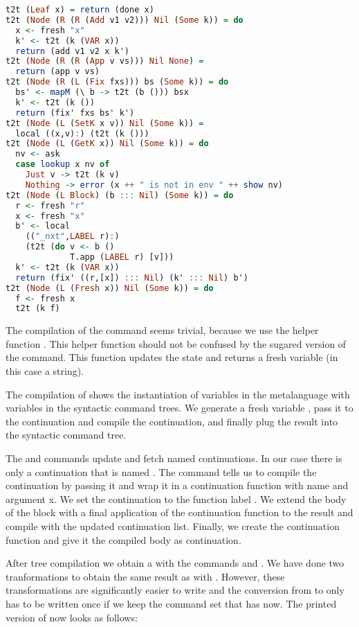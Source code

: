 \begin{lstlisting}[language=Haskell]
t2t (Leaf x) = return (done x)
t2t (Node (R (R (Add v1 v2))) Nil (Some k)) = do
  x <- fresh "x"
  k' <- t2t (k (VAR x))
  return (add v1 v2 x k')
t2t (Node (R (R (App v vs))) Nil None) =
  return (app v vs)
t2t (Node (R (L (Fix fxs))) bs (Some k)) = do
  bs' <- mapM (\ b -> t2t (b ())) bsx
  k' <- t2t (k ())
  return (fix' fxs bs' k')
t2t (Node (L (SetK x v)) Nil (Some k)) =
  local ((x,v):) (t2t (k ()))
t2t (Node (L (GetK x)) Nil (Some k)) = do
  nv <- ask
  case lookup x nv of
    Just v -> t2t (k v)
    Nothing -> error (x ++ " is not in env " ++ show nv)
t2t (Node (L Block) (b ::: Nil) (Some k)) = do
  r <- fresh "r"
  x <- fresh "x"
  b' <- local
    (("_nxt",LABEL r):)
    (t2t (do v <- b ()
             T.app (LABEL r) [v]))
  k' <- t2t (k (VAR x))
  return (fix' ((r,[x]) ::: Nil) (k' ::: Nil) b')
t2t (Node (L (Fresh x)) Nil (Some k)) = do
  f <- fresh x
  t2t (k f)
\end{lstlisting}

The compilation of the  command seems trivial, because we use the helper function . This helper function should not be confused by the sugared version of the  command. This function updates the state and returns a fresh variable (in this case a string).

The compilation of  shows the instantiation of variables in the metalanguage with variables in the syntactic command trees. We generate a fresh variable , pass it to the continuation and compile the continuation, and finally plug the result into the syntactic command tree.

The  and  commands update and fetch named continuations. In our case there is only a continuation that is named . The  command tells us to compile the continuation  by passing it  and wrap it in a continuation function with name  and argument {x}. We set the continuation  to the function label . We extend the body of the block with a final application of the continuation function  to the result  and compile with the updated continuation list. Finally, we create the continuation function and give it the compiled body  as continuation.

After tree compilation we obtain a  with the commands  and . We have done two tranformations to obtain the same result as with . However, these transformations are significantly easier to write and the conversion from  to  only has to be written once if we keep the command set that  has now. The printed version of  now looks as follows:

